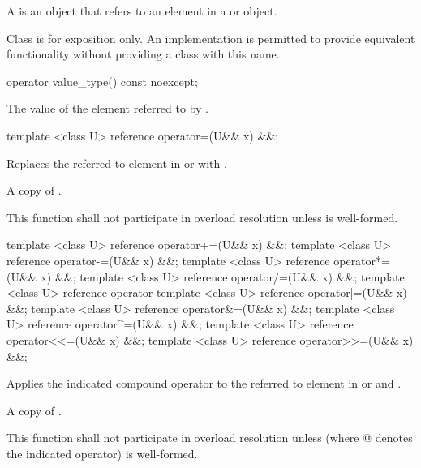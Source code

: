 \label{sec:reference type}
\pnum A  is an object that refers to an element in a \simd or \mask object.

\pnum Class  is for exposition only.
An implementation is permitted to provide equivalent functionality without providing a class with this name.



\begin{itemdecl}
operator value_type() const noexcept;
\end{itemdecl}
\begin{itemdescr}
  \pnum\returns The value of the element referred to by .
\end{itemdescr}

\begin{itemdecl}
template <class U> reference operator=(U&& x) &&;
\end{itemdecl}
\begin{itemdescr}
  \pnum\effects Replaces the referred to element in \simd or \mask with .

  \pnum\returns A copy of .

  \pnum\remarks This function shall not participate in overload resolution unless  is well-formed.
\end{itemdescr}

\begin{itemdecl}
template <class U> reference operator+=(U&& x) &&;
template <class U> reference operator-=(U&& x) &&;
template <class U> reference operator*=(U&& x) &&;
template <class U> reference operator/=(U&& x) &&;
template <class U> reference operator%
template <class U> reference operator|=(U&& x) &&;
template <class U> reference operator&=(U&& x) &&;
template <class U> reference operator^=(U&& x) &&;
template <class U> reference operator<<=(U&& x) &&;
template <class U> reference operator>>=(U&& x) &&;
\end{itemdecl}
\begin{itemdescr}
  \pnum\effects Applies the indicated compound operator to the referred to element in \simd or \mask and .

  \pnum\returns A copy of .

  \pnum\remarks This function shall not participate in overload resolution unless  (where \code @ denotes the indicated operator) is well-formed.
\end{itemdescr}

